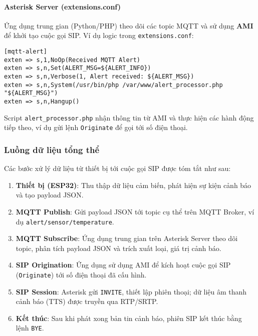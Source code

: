 \paragraph{Asterisk Server (extensions.conf)}
Ứng dụng trung gian (Python/PHP) theo dõi các topic MQTT và sử dụng \textbf{AMI} để khởi tạo cuộc gọi SIP. Ví dụ logic trong \texttt{extensions.conf}:
\begin{verbatim}
[mqtt-alert]
exten => s,1,NoOp(Received MQTT Alert)
exten => s,n,Set(ALERT_MSG=${ALERT_INFO})
exten => s,n,Verbose(1, Alert received: ${ALERT_MSG})
exten => s,n,System(/usr/bin/php /var/www/alert_processor.php "${ALERT_MSG}")
exten => s,n,Hangup()
\end{verbatim}
Script \texttt{alert\_processor.php} nhận thông tin từ AMI và thực hiện các hành động tiếp theo, ví dụ gửi lệnh \texttt{Originate} để gọi tới số điện thoại.

\subsubsection{Luồng dữ liệu tổng thể}
Các bước xử lý dữ liệu từ thiết bị tới cuộc gọi SIP được tóm tắt như sau:
\begin{enumerate}
    \item \textbf{Thiết bị (ESP32)}: Thu thập dữ liệu cảm biến, phát hiện sự kiện cảnh báo và tạo payload JSON.
    \item \textbf{MQTT Publish}: Gửi payload JSON tới topic cụ thể trên MQTT Broker, ví dụ \texttt{alert/sensor/temperature}.
    \item \textbf{MQTT Subscribe}: Ứng dụng trung gian trên Asterisk Server theo dõi topic, phân tích payload JSON và trích xuất loại, giá trị cảnh báo.
    \item \textbf{SIP Origination}: Ứng dụng sử dụng AMI để kích hoạt cuộc gọi SIP (\texttt{Originate}) tới số điện thoại đã cấu hình.
    \item \textbf{SIP Session}: Asterisk gửi \texttt{INVITE}, thiết lập phiên thoại; dữ liệu âm thanh cảnh báo (TTS) được truyền qua RTP/SRTP.
    \item \textbf{Kết thúc}: Sau khi phát xong bản tin cảnh báo, phiên SIP kết thúc bằng lệnh \texttt{BYE}.
\end{enumerate}

